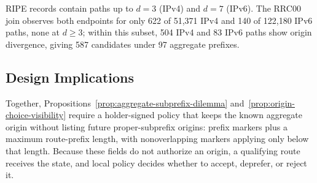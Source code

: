 \begin{table}[t]
\caption{RIPE allocation paths and origin divergence.}
\label{tab:visibility-candidates}
\centering\footnotesize\setlength{\tabcolsep}{3.0pt}

\end{table}

RIPE records contain paths up to $d=3$ (IPv4) and $d=7$ (IPv6). The RRC00 join observes both endpoints for only 622 of 51,371 IPv4 and 140 of 122,180 IPv6 paths, none at $d\geq3$; within this subset, 504 IPv4 and 83 IPv6 paths show origin divergence, giving 587 candidates under 97 aggregate prefixes.

\subsection{Design Implications}
\label{sec:requirements}

Together, Propositions~\ref{prop:aggregate-subprefix-dilemma} and~\ref{prop:origin-choice-visibility} require a holder-signed policy that keeps the known aggregate origin \explicit{} without listing future proper-subprefix origins: prefix markers plus a maximum route-prefix length, with nonoverlapping markers applying only below that length. Because these fields do not authorize an origin, a qualifying route receives the \openscope{} state, and local policy decides whether to accept, deprefer, or reject it.
